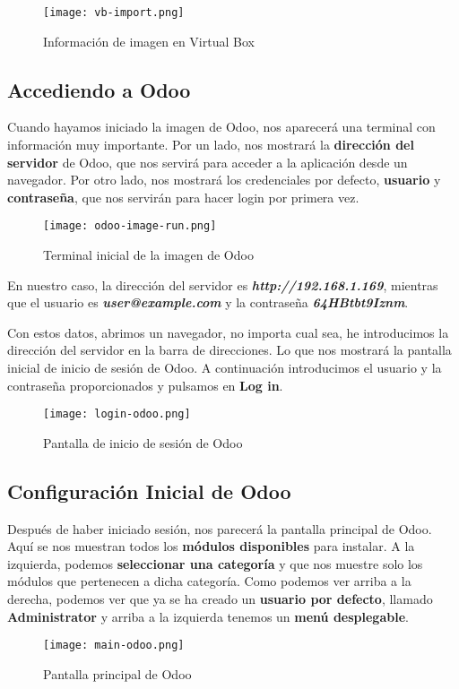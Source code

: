 \begin{figure}[h]
    \centering
    \texttt{[image: vb-import.png]}
    \caption{Información de imagen en Virtual Box}
\end{figure}


\subsection{Accediendo a Odoo}
Cuando hayamos iniciado la imagen de Odoo, nos aparecerá una terminal con información muy importante. Por un lado, nos mostrará la \textbf{dirección del servidor} de Odoo, que nos servirá para acceder a la aplicación desde un navegador. Por otro lado, nos mostrará los credenciales por defecto, \textbf{usuario} y \textbf{contraseña}, que nos servirán para hacer login por primera vez.

\begin{figure}[h]
    \centering
    \texttt{[image: odoo-image-run.png]}
    \caption{Terminal inicial de la imagen de Odoo}
\end{figure}

En nuestro caso, la dirección del servidor es \textbf{\textit{http://192.168.1.169}}, mientras que el usuario es \textbf{\textit{user@example.com}} y la contraseña \textbf{\textit{64HBtbt9Iznm}}.

Con estos datos, abrimos un navegador, no importa cual sea, he introducimos la dirección del servidor en la barra de direcciones. Lo que nos mostrará la pantalla inicial de inicio de sesión de Odoo. A continuación introducimos el usuario y la contraseña proporcionados y pulsamos en \textbf{Log in}.


\begin{figure}[h]
    \centering
    \texttt{[image: login-odoo.png]}
    \caption{Pantalla de inicio de sesión de Odoo}
\end{figure}

\subsection{Configuración Inicial de Odoo}
Después de haber iniciado sesión, nos parecerá la pantalla principal de Odoo. Aquí se nos muestran todos los\textbf{ módulos disponibles} para instalar. A la izquierda, podemos \textbf{seleccionar una categoría} y que nos muestre solo los módulos que pertenecen a dicha categoría. Como podemos ver arriba a la derecha, podemos ver que ya se ha creado un \textbf{usuario por defecto}, llamado \textbf{Administrator} y arriba a la izquierda tenemos un \textbf{menú desplegable}.

\begin{figure}[h]
    \centering
    \texttt{[image: main-odoo.png]}
    \caption{Pantalla principal de Odoo}
\end{figure}



\newpage



